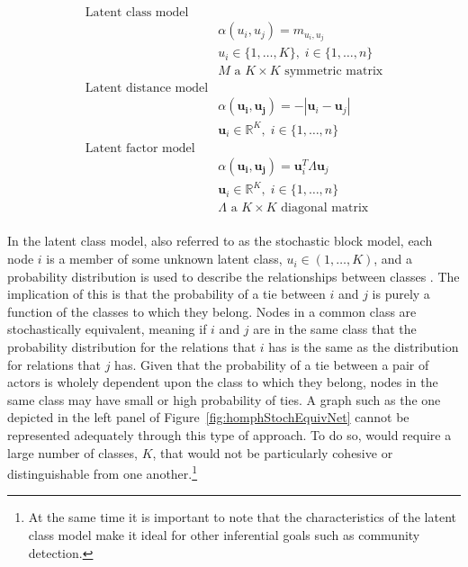 \begin{align}
\begin{aligned}
\text{Latent class model} \\
	&\alpha(u_{i}, u_{j}) = m_{u_{i}, u_{j}} \\
	&u_{i} \in \{1, \ldots, K \}, \; i \in \{1,\ldots, n\} \\
	&M \text{ a } K \times K \text{ symmetric matrix} \\
\text{Latent distance model} \\
	&\alpha(\bm{u_{i}}, \bm{u_{j}}) = -|\bm u_{i} - \bm u_{j}| \\
	&\bm u_{i} \in \mathbb{R}^{K}, \; i \in \{1, \ldots, n \} \\
\text{Latent factor model} \\
	&\alpha(\bm{u_{i}}, \bm{u_{j}}) = \bm u_{i}^{T} \Lambda \bm u_{j} \\
	&\bm u_{i} \in \mathbb{R}^{K}, \; i \in \{1, \ldots, n \} \\
	&\Lambda \text{ a } K \times K \text{ diagonal matrix}
\label{eqn:latAlpha}
\end{aligned}
\end{align}

In the latent class model, also referred to as the stochastic block model, each node $i$ is a member of some unknown latent class, $u_{i} \in (1,\ldots,K)$, and a probability distribution is used to describe the relationships between classes  \citep{nowicki:snijders:2001}. The implication of this is that the probability of a tie between $i$ and $j$ is purely a function of the classes to which they belong. Nodes in a common class are stochastically equivalent, meaning if $i$ and $j$ are in the same class that the probability distribution for the relations that $i$ has is the same as the distribution for relations that $j$ has. Given that the probability of a tie between a pair of actors is wholely dependent upon the class to which they belong, nodes in the same class may have small or high probability of ties. A graph such as the one depicted in the left panel of Figure~\ref{fig:homphStochEquivNet} cannot be represented adequately through this type of approach. To do so, would require a large number of classes, $K$, that would not be particularly cohesive or distinguishable from one another.\footnote{At the same time it is important to note that the characteristics of the latent class model make it ideal for other inferential goals such as community detection.}

